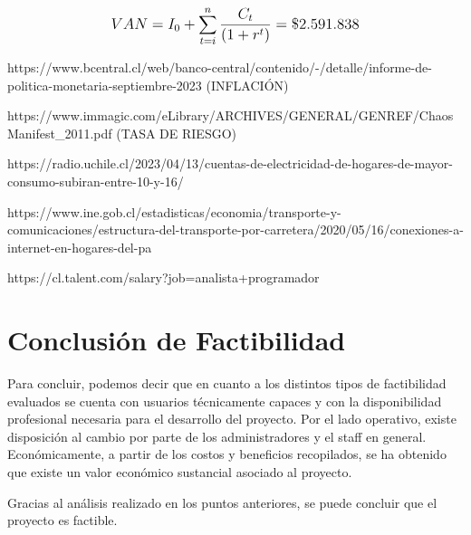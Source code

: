 \[
\mathlarger{
	{VAN} = I_0 + \sum\limits_{t=i}^{n}\frac{C_t}{\left(1+r^t\right)} = \$2.591.838
}
\]

https://www.bcentral.cl/web/banco-central/contenido/-/detalle/informe-de-politica-monetaria-septiembre-2023 (INFLACIÓN)

https://www.immagic.com/eLibrary/ARCHIVES/GENERAL/GENREF/ChaosManifest\_2011.pdf (TASA DE RIESGO)

https://radio.uchile.cl/2023/04/13/cuentas-de-electricidad-de-hogares-de-mayor-consumo-subiran-entre-10-y-16/

https://www.ine.gob.cl/estadisticas/economia/transporte-y-comunicaciones/estructura-del-transporte-por-carretera/2020/05/16/conexiones-a-internet-en-hogares-del-pa%

https://cl.talent.com/salary?job=analista+programador

\section{Conclusión de Factibilidad}
Para concluir, podemos decir que en cuanto a los distintos tipos de factibilidad evaluados se cuenta con usuarios técnicamente capaces y con la disponibilidad profesional necesaria para el desarrollo del proyecto. Por el lado operativo, existe disposición al cambio por parte de los administradores y el staff en general. Económicamente, a partir de los costos y beneficios recopilados, se ha obtenido que existe un valor económico sustancial asociado al proyecto.

Gracias al análisis realizado en los puntos anteriores, se puede concluir que el proyecto es factible.
